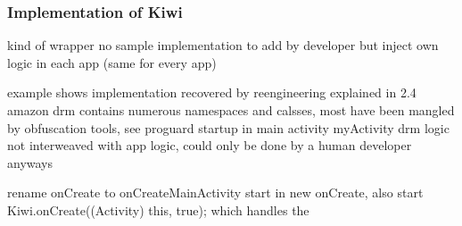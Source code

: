 \subsubsection{Implementation of Kiwi} \label{section:license-amazon-implementation}
kind of wrapper
no sample implementation to add by developer but inject own logic in each app (same for every app)

example shows implementation recovered by reengineering explained in 2.4
amazon drm contains numerous namespaces and calsses, most have been mangled by obfuscation tools, see proguard
startup in main activity myActivity
drm logic not interweaved with app logic, could only be done by a human developer anyways\cite{munteanLicense}
%




rename onCreate to onCreateMainActivity
start in new onCreate, also start Kiwi.onCreate((Activity) this, true); which handles the
